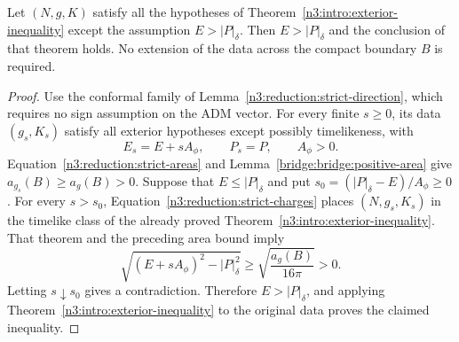 \begin{corollary}
\label{bridge:bridge:timelike}
Let $(N,g,K)$ satisfy all the hypotheses of
Theorem~\ref{n3:intro:exterior-inequality} except the assumption $E>|P|_\delta$.
Then $E>|P|_\delta$ and the conclusion of that theorem holds.
No extension of the data across the compact boundary $B$ is required.
\end{corollary}

\begin{proof}
Use the conformal family of Lemma~\ref{n3:reduction:strict-direction},
which requires no sign assumption on the ADM vector.  For every finite
$s\ge0$, its data $(g_s,K_s)$ satisfy all exterior hypotheses except
possibly timelikeness, with
\[
 E_s=E+sA_\phi,\qquad P_s=P,\qquad A_\phi>0.
\]
Equation~\eqref{n3:reduction:strict-areas} and
Lemma~\ref{bridge:bridge:positive-area} give
$a_{g_s}(B)\ge a_g(B)>0$.
Suppose that $E\le|P|_\delta$ and put
$s_0=(|P|_\delta-E)/A_\phi\ge0$.  For every $s>s_0$,
Equation~\eqref{n3:reduction:strict-charges} places $(N,g_s,K_s)$ in the
timelike class of the already proved
Theorem~\ref{n3:intro:exterior-inequality}.  That theorem and
the preceding area bound imply
\[
 \sqrt{(E+sA_\phi)^2-|P|_\delta^2}
       \ge\sqrt{\frac{a_g(B)}{16\pi}}>0.
\]
Letting $s\downarrow s_0$ gives a contradiction.  Therefore
$E>|P|_\delta$, and applying Theorem~\ref{n3:intro:exterior-inequality}
to the original data proves the claimed inequality.
\end{proof}


